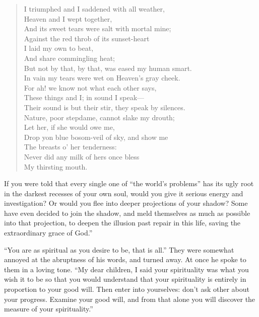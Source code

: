 \begin{quotex}
\begin{verse}
I triumphed and I saddened with all weather,\\
Heaven and I wept together,\\
And its sweet tears were salt with mortal mine;\\
Against the red throb of its sunset-heart\\
I laid my own to beat,\\
And share commingling heat;\\
But not by that, by that, was eased my human smart.\\
In vain my tears were wet on Heaven's gray cheek.\\
For ah! we know not what each other says,\\
These things and I; in sound I speak---\\
Their sound is but their stir, they speak by silences.\\
Nature, poor stepdame, cannot slake my drouth;\\
Let her, if she would owe me,\\
Drop yon blue bosom-veil of sky, and show me\\
The breasts o' her tenderness:\\
Never did any milk of hers once bless\\
My thirsting mouth.
\end{verse}
\end{quotex}


If you were told that every single one of ``the world's problems'' has its ugly root in the darkest recesses of your own soul, would you give it serious energy and investigation? Or would you flee into deeper projections of your shadow? Some have even decided to join the shadow, and meld themselves as much as possible into that projection, to deepen the illusion past repair in this life, saving the extraordinary grace of God.''

\begin{quotex}
``You are as spiritual as you desire to be, that is all.'' They were somewhat annoyed at the abruptness of his words, and turned away. At once he spoke to them in a loving tone. ``My dear children, I said your spirituality was what you wish it to be so that you would understand that your spirituality is entirely in proportion to your good will. Then enter into yourselves: don't ask other about your progress. Examine your good will, and from that alone you will discover the measure of your spirituality.''
\end{quotex}


